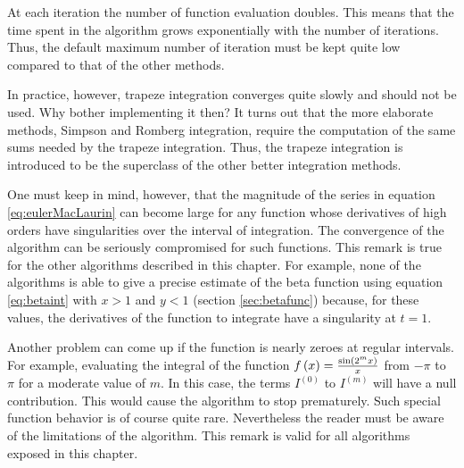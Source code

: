 At each iteration the number of function evaluation doubles. This
means that the time spent in the algorithm grows exponentially
with the number of iterations. Thus, the default maximum number of
iteration must be kept quite low compared to that of the other
methods.

In practice, however, trapeze integration converges quite slowly
and should not be used. Why bother implementing it then? It turns
out that the more elaborate methods, Simpson and Romberg
integration, require the computation of the same sums needed by
the trapeze integration. Thus, the trapeze integration is
introduced to be the superclass of the other better integration
methods.

One must keep in mind, however, that the magnitude of the series
in equation \ref{eq:eulerMacLaurin} can become large for any
function whose derivatives of high orders have singularities over
the interval of integration. The convergence of the algorithm can
be seriously compromised for such functions. This remark is true
for the other algorithms described in this chapter. For example,
none of the algorithms is able to give a precise estimate of the
beta function using equation \ref{eq:betaint} with $x>1$ and $y<1$
(\cf section \ref{sec:betafunc}) because, for these values, the
derivatives of the function to integrate have a singularity at
$t=1$.

Another problem can come up if the function is nearly zeroes at
regular intervals. For example, evaluating the integral of the
function $f\left(x\right)={\sin\left(2^mx\right)\over x}$  from
$-\pi$ to $\pi$ for a moderate value of $m$. In this case, the
terms $I^{\left(0\right)}$ to $I^{\left(m\right)}$ will have a
null contribution. This would cause the algorithm to stop
prematurely. Such special function behavior is of course quite
rare. Nevertheless the reader must be aware of the limitations of
the algorithm. This remark is valid for all algorithms exposed in
this chapter.

